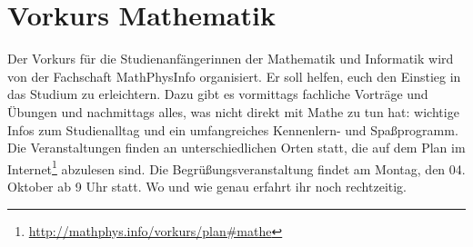 \section{Vorkurs Mathematik}
Der Vorkurs für die Studienanfängerinnen der Mathematik und Informatik wird von der Fachschaft MathPhysInfo organisiert. Er soll helfen, euch den Einstieg in das Studium zu erleichtern. Dazu gibt es vormittags fachliche Vorträge und Übungen und nachmittags alles, was nicht direkt mit Mathe zu tun hat: wichtige Infos zum Studienalltag und ein umfangreiches Kennenlern- und Spaßprogramm.
Die Veranstaltungen finden an unterschiedlichen Orten statt, die auf dem Plan im Internet\footnote{\url{http://mathphys.info/vorkurs/plan\#mathe}} abzulesen sind. Die Begrüßungsveranstaltung findet am Montag, den 04. Oktober ab 9 Uhr statt. Wo und wie genau erfahrt ihr noch rechtzeitig.
